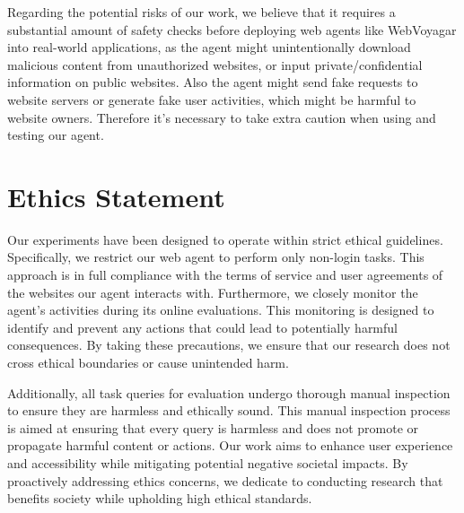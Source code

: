 \documentclass[11pt]{article}
\begin{document}
Regarding the potential risks of our work, we believe that it requires a substantial amount of safety checks before deploying web agents like WebVoyagar into real-world applications, as the agent might unintentionally download malicious content from unauthorized websites, or input private/confidential information on public websites. Also the agent might send fake requests to website servers or generate fake user activities, which might be harmful to website owners. Therefore it's necessary to take extra caution when using and testing our agent. 


\section*{Ethics Statement}
Our experiments have been designed to operate within strict ethical guidelines. Specifically, we restrict our web agent to perform only non-login tasks. This approach is in full compliance with the terms of service and user agreements of the websites our agent interacts with. Furthermore, we closely monitor the agent's activities during its online evaluations. This monitoring is designed to identify and prevent any actions that could lead to potentially harmful consequences. By taking these precautions, we ensure that our research does not cross ethical boundaries or cause unintended harm.

Additionally, all task queries for evaluation undergo thorough manual inspection to ensure they are harmless and ethically sound. This manual inspection process is aimed at ensuring that every query is harmless and does not promote or propagate harmful content or actions. Our work aims to enhance user experience and accessibility while mitigating potential negative societal impacts. By proactively addressing ethics concerns, we dedicate to conducting research that benefits society while upholding high ethical standards.








\end{document}

